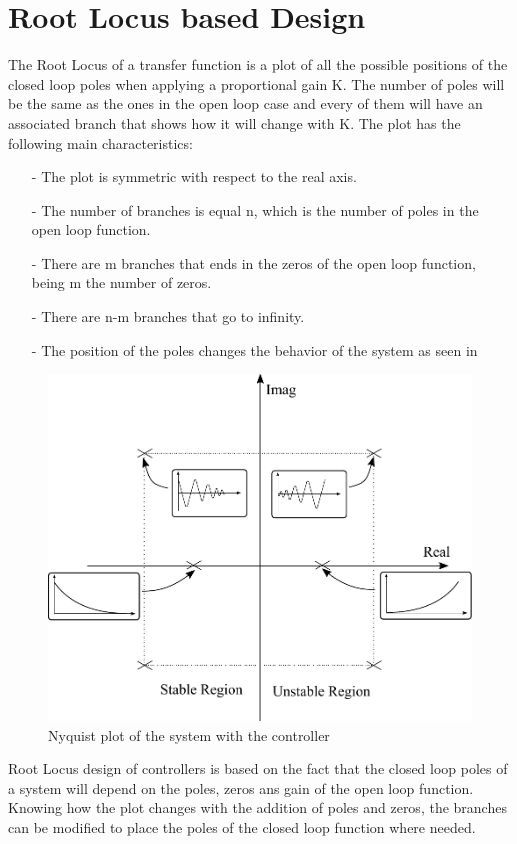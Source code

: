 \section{Root Locus based Design}\label{rLocus}
The Root Locus of a transfer function is a plot of all the possible positions of the closed loop poles when applying a proportional gain K. The number of poles will be the same as the ones in the open loop case and every of them will have an associated branch that shows how it will change with K. The plot has the following main characteristics:

\begin{itemize}
	\item[-] The plot is symmetric with respect to the real axis.
	\item[-] The number of branches is equal n, which is the number of poles in the open loop function.
	\item[-] There are m branches that ends in the zeros of the open loop function, being m the number of zeros.
	\item[-] There are n-m branches that go to infinity.
	\item[-] The position of the poles changes the behavior of the system as seen in 
\end{itemize}

\begin{figure}[H] 
	\centering 
	\includegraphics[scale=0.5]{figures/rLocusStability}	
	\caption{Nyquist plot of the system with the controller}
	\label{rLocusStability}
\end{figure}
%
Root Locus design of controllers is based on the fact that the closed loop poles of a system will depend on the poles, zeros ans gain of the open loop function. Knowing how the plot changes with the addition of poles and zeros, the branches can be modified to place the poles of the closed loop function where needed.


